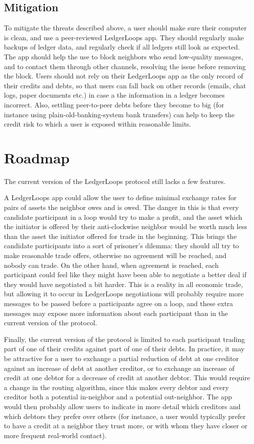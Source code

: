 \documentclass[11pt,twoside,a4paper]{article}
\begin{document}
\subsection{Mitigation}
To mitigate the threats described above, a user should make sure their computer is clean, and use a peer-reviewed LedgerLoops app.
They should regularly make backups of ledger data, and regularly check if all ledgers still look as expected.
The app should help the use to block neighbors who send low-quality messages, and to contact them through other channels, resolving the issue before removing the block.
Users should not rely on their LedgerLoops app as the only record of their credits and debts, so that users can fall back on other records (emails, chat logs, paper documents etc.) in case a the information in a ledger becomes incorrect. Also, settling peer-to-peer debts before they become to big (for instance using plain-old-banking-system bank transfers) can help to keep the credit risk to which a user is exposed within reasonable limits.

\section{Roadmap}
The current version of the LedgerLoops protocol still lacks a few features. 

A LedgerLoops app could allow the user to define minimal exchange rates for pairs of assets the neighbor owes and is owed. The danger in this is that every candidate participant in a loop would try to make a profit, and the asset which the initiator is offered by their anti-clockwise neighbor would be worth much less than the asset the initiator offered for trade in the beginning. This brings the candidate participants into a sort of prisoner's dilemma: they should all try to make reasonable trade offers, otherwise no agreement will be reached, and nobody can trade. On the other hand, when agreement is reached, each participant could feel like they might have been able to negotiate a better deal if they would have negotiated a bit harder. This is a reality in all economic trade, but allowing it to occur in LedgerLoops negotiations will probably require more messages to be passed before a participants agree on a loop, and these extra messages may expose more information about each participant than in the current version of the protocol.

Finally, the current version of the protocol is limited to each participant trading part of one of their credits against part of one of their debts. In practice, it may be attractive for a user to exchange a partial reduction of debt at one creditor against an increase of debt at another creditor, or to exchange an increase of credit at one debtor for a decrease of credit at another debtor. This would require a change in the routing algorithm, since this makes every debtor and every creditor both a potential in-neighbor and a potential out-neighbor. The app would then probably allow users to indicate in more detail which creditors and which debtors they prefer over others (for instance, a user would typically prefer to have a credit at a neighbor they trust more, or with whom they have closer or more frequent real-world contact).
\end{document}
